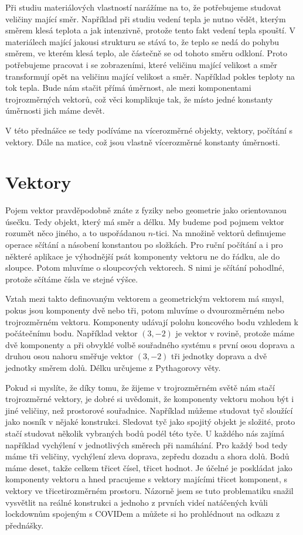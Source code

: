 \documentclass[12pt]{article}
\begin{document}
Při studiu materiálových vlastností narážíme na to, že potřebujeme studovat veličiny mající směr. Například při studiu vedení tepla je nutno vědět, kterým směrem klesá teplota a jak intenzivně, protože tento fakt vedení tepla spouští. V materiálech mající jakousi strukturu se stává to, že teplo se nedá do pohybu směrem, ve kterém klesá teplo, ale částečně se od tohoto směru odkloní. Proto potřebujeme pracovat i se zobrazeními, které veličinu mající velikost a směr transformují opět na veličinu mající velikost a směr. Například pokles teploty na tok tepla. Bude nám stačit přímá úměrnost, ale mezi komponentami trojrozměrných vektorů, což věci komplikuje tak, že místo jedné konstanty úměrnosti jich máme devět.

V této přednášce se tedy podíváme na vícerozměrné objekty, vektory, počítání s vektory. Dále na matice, což jsou vlastně vícerozměrné konstanty úměrnosti.

\section*{Vektory}

Pojem vektor pravděpodobně znáte z fyziky nebo geometrie jako orientovanou úsečku. Tedy objekt, který má směr a délku. My budeme pod pojmem vektor rozumět něco jiného, a to uspořádanou $n$-tici. Na množině vektorů definujeme operace sčítání a násobení konstantou po složkách. Pro ruční počítání a i pro některé aplikace je  výhodnější psát komponenty vektoru ne do řádku, ale do sloupce. Potom mluvíme o sloupcových vektorech. S nimi je sčítání pohodlné, protože sčítáme čísla ve stejné výšce.

Vztah mezi takto definovaným vektorem a geometrickým vektorem má smysl, pokus jsou komponenty dvě nebo tři, potom mluvíme o dvourozměrném nebo trojrozměrném vektoru. Komponenty udávají polohu koncového bodu vzhledem k počátečnímu bodu. Například vektor $(3,-2)$ je vektor v rovině, protože máme dvě komponenty a při obvyklé volbě souřadného systému s první osou doprava a druhou osou nahoru směřuje vektor $(3,-2)$ tři jednotky doprava a dvě jednotky směrem dolů. Délku určujeme z Pythagorovy věty. 

Pokud si myslíte, že díky tomu, že žijeme v trojrozměrném světě nám stačí trojrozměrné vektory, je dobré si uvědomit, že komponenty vektoru mohou být i jiné veličiny, než prostorové souřadnice. Například můžeme studovat tyč sloužící jako nosník v nějaké konstrukci. Sledovat tyč jako spojitý objekt je složité, proto stačí studovat několik vybraných bodů podél této tyče. U každého nás zajímá například vychýlení v jednotlivých směrech při namáhání. Pro každý bod tedy máme tři veličiny, vychýlení zleva doprava, zepředu dozadu a shora dolů. Bodů máme deset, takže celkem třicet čísel, třicet hodnot. Je účelné je poskládat jako komponenty vektoru a hned pracujeme s vektory majícími třicet komponent, s vektory ve třicetirozměrném prostoru. Názorně jsem se tuto problematiku snažil vysvětlit na reálné konstrukci a jednoho z prvních videí natáčených kvůli lockdownům spojeným s COVIDem a můžete si ho prohlédnout na odkazu z přednášky. 
\end{document}
